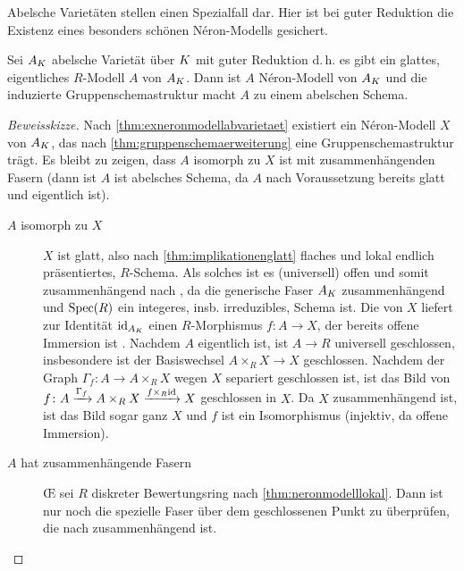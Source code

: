 \documentclass[german]{scrreprt}
\begin{document}
Abelsche Varietäten stellen einen Spezialfall dar. Hier ist bei guter
Reduktion die Existenz eines besonders schönen Néron-Modells gesichert.
\begin{Satz}\label{thm:abelscheneronmodelle}
  \cite[1.4, Proposition 2]{neron}
  Sei $A_{K}$ abelsche Varietät über $K$ mit guter Reduktion
  d.\,h. es gibt ein glattes, eigentliches $R$-Modell $A$ von $A_{K}$.
  Dann ist $A$ Néron-Modell von $A_{K}$ und die induzierte
  Gruppenschemastruktur macht $A$ zu einem abelschen Schema.
  \begin{proof}[Beweisskizze]
    Nach \ref{thm:exneronmodellabvarietaet} existiert ein
    Néron-Modell $X$ von $A_{K}$, das nach
    \ref{thm:gruppenschemaerweiterung} eine Gruppenschemastruktur
    trägt.
    Es bleibt zu zeigen, dass $A$ isomorph zu $X$ ist
    mit zusammenhängenden Fasern (dann ist $A$ ist abelsches Schema,
    da $A$ nach Voraussetzung bereits glatt und eigentlich ist).
    \begin{description}
    \item[$A$ isomorph zu $X$] $X$ ist glatt, also nach
      \ref{thm:implikationenglatt} flaches und lokal endlich
      präsentiertes, $R$-Schema.
      Als solches ist es (universell) offen \cite[Theorem 14.33]{wedhorn}
      und somit zusammenhängend nach \cite[Proposition 3.24]{wedhorn},
      da die generische Faser $A_{K}$ zusammenhängend und $\operatorname{Spec}(R)$
      ein integeres, insb. irreduzibles, Schema ist.
      Die \NAbbEig von $X$ liefert zur Identität $\mathrm{id}_{A_{K}}$ einen
      $R$-Morphismus $f\colon A\to X$, der bereits offene Immersion ist
      \cite[4.3/1 (ii) oder 4.4/1]{neron}.
      Nachdem $A$ eigentlich ist, ist $A\to R$ universell geschlossen,
      insbesondere ist der Basiswechsel $A\times_R X\to X$ geschlossen.
      Nachdem der Graph $\Gamma_f\colon A\to A\times_R X$ wegen $X$
      separiert geschlossen ist, ist das Bild von
      $f\colon A\xrightarrow{\Gamma_f} A\times_R X\xrightarrow{f\times_R\mathrm{id}} X$
      geschlossen in $X$.
      Da $X$ zusammenhängend ist, ist das Bild sogar ganz $X$ und $f$
      ist ein Isomorphismus (injektiv, da offene Immersion).
    \item[$A$ hat zusammenhängende Fasern]
      \OE{} sei $R$ diskreter Bewertungsring nach
      \ref{thm:neronmodelllokal}.
      Dann ist nur noch die spezielle Faser über dem geschlossenen
      Punkt zu überprüfen, die nach \cite[5.5.1]{EGAIII-1} zusammenhängend
      ist.
    \end{description}
  \end{proof}
\end{Satz}
\end{document}
